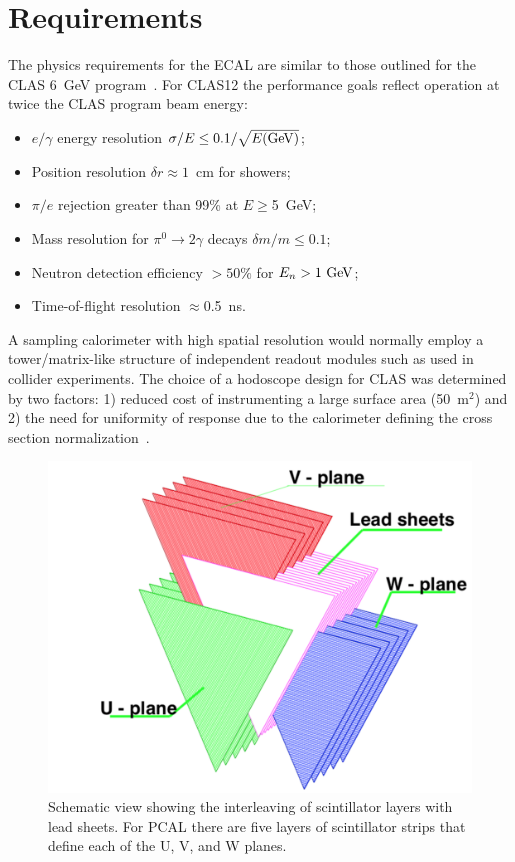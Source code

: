 \section{Requirements}

The physics requirements for the ECAL are similar to those outlined for the CLAS 6~GeV program~\cite{clas6nim}.
For CLAS12 the performance goals reflect operation at twice the CLAS program beam energy:

\begin{itemize}
\item $e/\gamma$ energy resolution $\sigma/E \le 0.1/\sqrt{E({\rm GeV})}$; 
\item Position resolution $\delta r\approx 1$~cm for showers;
\item $\pi/e$ rejection greater than 99\% at $E\ge$5~GeV;
\item Mass resolution for $\pi^0 \to 2\gamma$ decays $\delta m/m \le 0.1$;
\item Neutron detection efficiency $>50\%$ for $E_n>1~{\rm GeV}$;
\item Time-of-flight resolution $\approx$0.5~ns.
\end{itemize}

A sampling calorimeter with high spatial resolution would normally employ a tower/matrix-like structure of
independent readout modules such as used in collider experiments.  The choice of a hodoscope design for CLAS
was determined by two factors: 1) reduced cost of instrumenting a large surface area (50~m$^2$) and 2) the need
for uniformity of response due to the calorimeter defining the cross section normalization~\cite{1990014}.

\begin{figure}[hbt]
\centering
\includegraphics[width=0.95\columnwidth,keepaspectratio]{img/S3_2.png}
\caption[PCAL UVW Layers]{Schematic view showing the interleaving of scintillator layers with lead sheets. For
  PCAL there are five layers of scintillator strips that define each of the U, V, and W planes.}
\label{fig:S3_2}
\end{figure}

